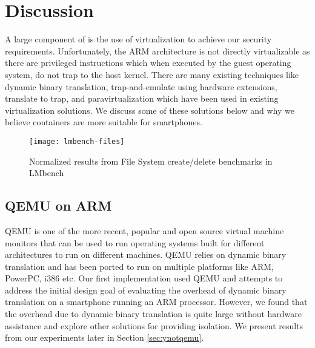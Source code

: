 \section{Discussion}
\label{sec:discuss}

A large component of \emph{\proj} is the use of virtualization to achieve our security requirements.  Unfortunately, the ARM architecture is not directly virtualizable as there are privileged instructions which when executed by the guest operating system, do not trap to the host kernel. There are many existing techniques like dynamic binary translation, trap-and-emulate using hardware extensions, translate to trap, and paravirtualization which have been used in existing virtualization solutions. We discuss some of these solutions below and why we believe containers are more suitable for smartphones.


\begin{figure*}[!t]
\centering
\texttt{[image: lmbench-files]}
\caption{Normalized results from File System create/delete benchmarks in LMbench}
\label{fig:lmbench-files}
\end{figure*}

\subsection{QEMU on ARM}
QEMU \cite{qemu} is one of the more recent, popular and open source virtual machine monitors that can be used to run operating systems built for different architectures to run on different machines. QEMU relies on dynamic binary translation and has been ported to run on multiple platforms like ARM, PowerPC, i386 etc. Our first implementation used QEMU and attempts to address the initial design goal of evaluating the overhead of dynamic binary translation on a smartphone running an ARM processor. However, we found that the overhead due to dynamic binary translation is quite large without hardware assistance and explore other solutions for providing isolation. We present results from our experiments later in Section \ref{sec:ynotqemu}.

